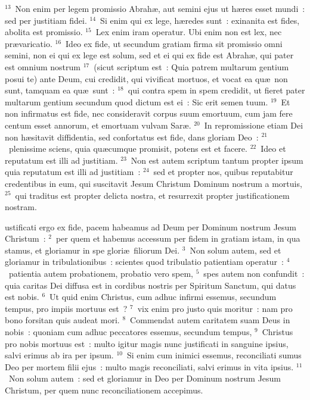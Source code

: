 ${}^{13}$~Non enim per legem promissio Abrah\ae , aut semini ejus ut h\ae res esset mundi~: sed per justitiam fidei.
${}^{14}$~Si enim qui ex lege, h\ae redes sunt~: exinanita est fides, abolita est promissio.
${}^{15}$~Lex enim iram operatur. Ubi enim non est lex, nec pr\ae varicatio.
${}^{16}$~Ideo ex fide, ut secundum gratiam firma sit promissio omni semini, non ei qui ex lege est solum, sed et ei qui ex fide est Abrah\ae , qui pater est omnium nostrum
${}^{17}$~(sicut scriptum est~: Quia patrem multarum gentium posui te) ante Deum, cui credidit, qui vivificat mortuos, et vocat ea qu\ae\ non sunt, tamquam ea qu\ae\ sunt~:
${}^{18}$~qui contra spem in spem credidit, ut fieret pater multarum gentium secundum quod dictum est ei~: Sic erit semen tuum.
${}^{19}$~Et non infirmatus est fide, nec consideravit corpus suum emortuum, cum jam fere centum esset annorum, et emortuam vulvam Sar\ae .
${}^{20}$~In repromissione etiam Dei non h\ae sitavit diffidentia, sed confortatus est fide, dans gloriam Deo~:
${}^{21}$~plenissime sciens, quia qu\ae cumque promisit, potens est et facere.
${}^{22}$~Ideo et reputatum est illi ad justitiam.
${}^{23}$~Non est autem scriptum tantum propter ipsum quia reputatum est illi ad justitiam~:
${}^{24}$~sed et propter nos, quibus reputabitur credentibus in eum, qui suscitavit Jesum Christum Dominum nostrum a mortuis,
${}^{25}$~qui traditus est propter delicta nostra, et resurrexit propter justificationem nostram.

\bchapter
{}ustificati ergo ex fide, pacem habeamus ad Deum per Dominum nostrum Jesum Christum~:
${}^{2}$~per quem et habemus accessum per fidem in gratiam istam, in qua stamus, et gloriamur in spe glori\ae\ filiorum Dei.
${}^{3}$~Non solum autem, sed et gloriamur in tribulationibus~: scientes quod tribulatio patientiam operatur~:
${}^{4}$~patientia autem probationem, probatio vero spem,
${}^{5}$~spes autem non confundit~: quia caritas Dei diffusa est in cordibus nostris per Spiritum Sanctum, qui datus est nobis.
${}^{6}$~Ut quid enim Christus, cum adhuc infirmi essemus, secundum tempus, pro impiis mortuus est~?
${}^{7}$~vix enim pro justo quis moritur~: nam pro bono forsitan quis audeat mori.
${}^{8}$~Commendat autem caritatem suam Deus in nobis~: quoniam cum adhuc peccatores essemus, secundum tempus,
${}^{9}$~Christus pro nobis mortuus est~: multo igitur magis nunc justificati in sanguine ipsius, salvi erimus ab ira per ipsum.
${}^{10}$~Si enim cum inimici essemus, reconciliati sumus Deo per mortem filii ejus~: multo magis reconciliati, salvi erimus in vita ipsius.
${}^{11}$~Non solum autem~: sed et gloriamur in Deo per Dominum nostrum Jesum Christum, per quem nunc reconciliationem accepimus.


